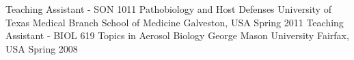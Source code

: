 

\begin{cventries}

  \vspace{-4.0mm}
  \cventry
    {Teaching Assistant - SON 1011 Pathobiology and Host Defenses} %
    {University of Texas Medical Branch School of Medicine} %
    {Galveston, USA} %
    {Spring 2011} %
    {} 
      \vspace{-2.0mm}
  \cventry
    {Teaching Assistant - BIOL 619 Topics in Aerosol Biology} %
    {George Mason University} %
    {Fairfax, USA} %
    {Spring 2008} %
    {}
  \vspace{-4.0mm}
\end{cventries}
